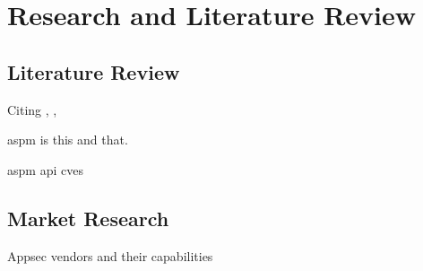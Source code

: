 \chapter{Research and Literature Review}
\label{ch:literature-review}

\section{Literature Review}

Citing \cite{Anderson2020}, \cite{Strengholt2025},

\gls{aspm} is this and that.     %

\gls{aspm}     %
\Gls{api}      %
\glspl{cve}    %

\section{Market Research}

Appsec vendors and their capabilities